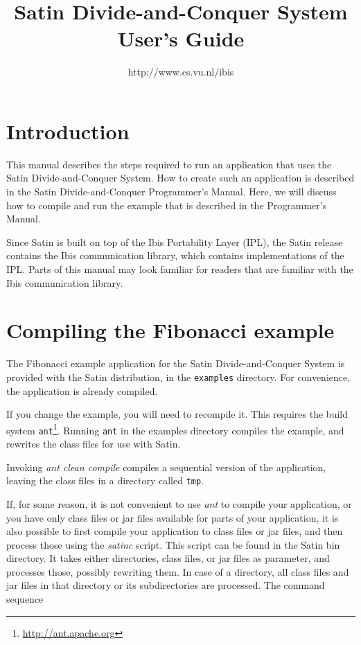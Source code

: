 \documentclass[a4paper,10pt]{article}
\begin{document}
\title{Satin Divide-and-Conquer System User's Guide}

\author{http://www.cs.vu.nl/ibis}

\maketitle

\section{Introduction}

This manual describes the steps required to run an application that
uses the Satin Divide-and-Conquer System. How to create such an application
is described in the Satin Divide-and-Conquer Programmer's Manual.
Here, we will discuss how to compile and run the example that is described
in the Programmer's Manual.

Since Satin is built on top of the Ibis Portability Layer (IPL),
the Satin release contains the Ibis communication library, which contains
implementations of the IPL. Parts of this manual may look familiar for
readers that are familiar with the Ibis communication library.

\section{Compiling the Fibonacci example}

The Fibonacci example application for the Satin Divide-and-Conquer System is
provided with the Satin distribution, in the \texttt{examples} directory.
For convenience, the application is already compiled.

If you change the example, you will need to recompile it. This
requires the build system \texttt{ant}\footnote{\url{http://ant.apache.org}}.
Running \texttt{ant} in the examples directory compiles the example,
and rewrites the class files for use with Satin.

Invoking \emph{ant clean compile} compiles a sequential version
of the application,
leaving the class files in a directory called \texttt{tmp}.

If, for some reason, it is not convenient to use \emph{ant} to compile
your application, or you have only class files or jar files available
for parts of your application, it is also possible to first compile
your application to class files or jar files, and then process those
using the \emph{satinc} script. This script can be found in the Satin
bin directory. It takes either directories, class files, or jar files
as parameter, and processes those, possibly rewriting them. In case
of a directory, all class files and jar files in that directory or
its subdirectories are processed.  The command sequence
\end{document}
